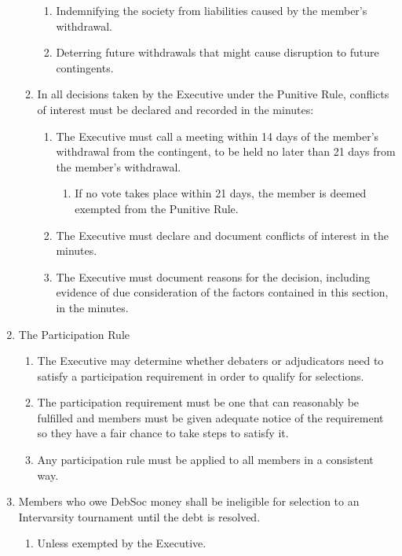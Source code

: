 \begin{enumerate}
\begin{enumerate}
    \begin{enumerate}
    \item Indemnifying the society from liabilities caused by the member’s withdrawal.
    \item Deterring future withdrawals that might cause disruption to future contingents.
    \end{enumerate}
  \item In all decisions taken by the Executive under the Punitive Rule, conflicts of interest must be declared and recorded in the minutes:
    \begin{enumerate}
    \item The Executive must call a meeting within 14 days of the member’s withdrawal from the contingent, to be held no later than 21 days from the member’s withdrawal.
      \begin{enumerate}
      \item If no vote takes place within 21 days, the member is deemed exempted from the Punitive Rule.
      \end{enumerate}
    \item The Executive must declare and document conflicts of interest in the minutes.
    \item The Executive must document reasons for the decision, including evidence of due consideration of the factors contained in this section, in the minutes.
    \end{enumerate}
  \end{enumerate}

\item The Participation Rule
  \begin{enumerate}
  \item The Executive may determine whether debaters or adjudicators need to satisfy a participation requirement in order to qualify for selections.
  \item The participation requirement must be one that can reasonably be fulfilled and members must be given adequate notice of the requirement so they have a fair chance to take steps to satisfy it.
  \item Any participation rule must be applied to all members in a consistent way.
  \end{enumerate}

\item Members who owe DebSoc money shall be ineligible for selection to an Intervarsity tournament until the debt is resolved.
  \begin{enumerate}
  \item Unless exempted by the Executive.
  \end{enumerate}


\end{enumerate}
